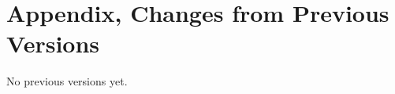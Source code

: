 \documentclass[11pt,a4paper]{ivoa}
\begin{document}
\section{Appendix, Changes from Previous Versions}

No previous versions yet.  






\end{document}
